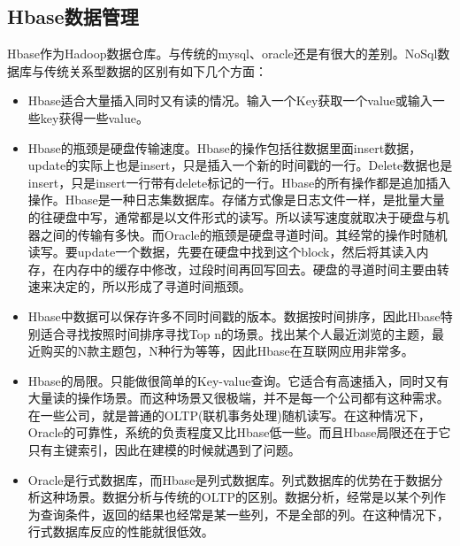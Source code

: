   \subsection{Hbase数据管理}
  Hbase作为Hadoop数据仓库。与传统的mysql、oracle还是有很大的差别。NoSql数据库与传统关系型数据的区别有如下几个方面：
  \begin{itemize}
  \item Hbase适合大量插入同时又有读的情况。输入一个Key获取一个value或输入一些key获得一些value。
  \item Hbase的瓶颈是硬盘传输速度。Hbase的操作包括往数据里面insert数据，update的实际上也是insert，只是插入一个新的时间戳的一行。Delete数据也是insert，只是insert一行带有delete标记的一行。Hbase的所有操作都是追加插入操作。Hbase是一种日志集数据库。存储方式像是日志文件一样，是批量大量的往硬盘中写，通常都是以文件形式的读写。所以读写速度就取决于硬盘与机器之间的传输有多快。而Oracle的瓶颈是硬盘寻道时间。其经常的操作时随机读写。要update一个数据，先要在硬盘中找到这个block，然后将其读入内存，在内存中的缓存中修改，过段时间再回写回去。硬盘的寻道时间主要由转速来决定的，所以形成了寻道时间瓶颈。
  \item Hbase中数据可以保存许多不同时间戳的版本。数据按时间排序，因此Hbase特别适合寻找按照时间排序寻找Top n的场景。找出某个人最近浏览的主题，最近购买的N款主题包，N种行为等等，因此Hbase在互联网应用非常多。
  \item Hbase的局限。只能做很简单的Key-value查询。它适合有高速插入，同时又有大量读的操作场景。而这种场景又很极端，并不是每一个公司都有这种需求。在一些公司，就是普通的OLTP(联机事务处理)随机读写。在这种情况下，Oracle的可靠性，系统的负责程度又比Hbase低一些。而且Hbase局限还在于它只有主键索引，因此在建模的时候就遇到了问题。
  \item Oracle是行式数据库，而Hbase是列式数据库。列式数据库的优势在于数据分析这种场景。数据分析与传统的OLTP的区别。数据分析，经常是以某个列作为查询条件，返回的结果也经常是某一些列，不是全部的列。在这种情况下，行式数据库反应的性能就很低效。
  \end{itemize}

